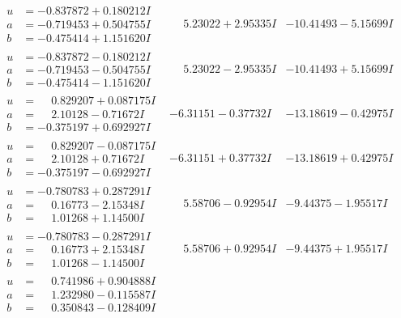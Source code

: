 \documentclass[1p]{elsarticle_modified}
\theoremstyle{definition}
\begin{document}
$$\begin{array}{c|c|c}
\begin{aligned}
u &= -0.837872 + 0.180212 I \\
a &= -0.719453 + 0.504755 I \\
b &= -0.475414 + 1.151620 I\end{aligned}
 & \phantom{-}5.23022 + 2.95335 I & -10.41493 - 5.15699 I \\ \hline\begin{aligned}
u &= -0.837872 - 0.180212 I \\
a &= -0.719453 - 0.504755 I \\
b &= -0.475414 - 1.151620 I\end{aligned}
 & \phantom{-}5.23022 - 2.95335 I & -10.41493 + 5.15699 I \\ \hline\begin{aligned}
u &= \phantom{-}0.829207 + 0.087175 I \\
a &= \phantom{-}2.10128 - 0.71672 I \\
b &= -0.375197 + 0.692927 I\end{aligned}
 & -6.31151 - 0.37732 I & -13.18619 - 0.42975 I \\ \hline\begin{aligned}
u &= \phantom{-}0.829207 - 0.087175 I \\
a &= \phantom{-}2.10128 + 0.71672 I \\
b &= -0.375197 - 0.692927 I\end{aligned}
 & -6.31151 + 0.37732 I & -13.18619 + 0.42975 I \\ \hline\begin{aligned}
u &= -0.780783 + 0.287291 I \\
a &= \phantom{-}0.16773 - 2.15348 I \\
b &= \phantom{-}1.01268 + 1.14500 I\end{aligned}
 & \phantom{-}5.58706 - 0.92954 I & -9.44375 - 1.95517 I \\ \hline\begin{aligned}
u &= -0.780783 - 0.287291 I \\
a &= \phantom{-}0.16773 + 2.15348 I \\
b &= \phantom{-}1.01268 - 1.14500 I\end{aligned}
 & \phantom{-}5.58706 + 0.92954 I & -9.44375 + 1.95517 I \\ \hline\begin{aligned}
u &= \phantom{-}0.741986 + 0.904888 I \\
a &= \phantom{-}1.232980 - 0.115587 I \\
b &= \phantom{-}0.350843 - 0.128409 I\end{aligned}

\end{array}$$
\end{document}
